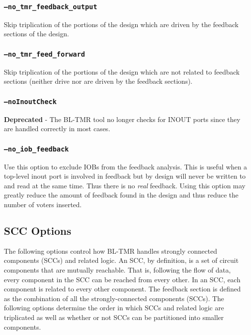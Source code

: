 \documentclass[english]{article}
\begin{document}
\subsubsection{\texttt{--no\_tmr\_feedback\_output}}
Skip triplication of the portions of the design which are driven by the 
feedback sections of the design.

\subsubsection{\texttt{--no\_tmr\_feed\_forward}}
Skip triplication of the portions of the design which are not related to 
feedback sections (neither drive nor are driven by the feedback sections).

\subsubsection{\texttt{--noInoutCheck}}
\textbf{Deprecated} - The BL-TMR tool no longer checks for INOUT ports since they
are handled correctly in most cases.

\subsubsection{\texttt{--no\_iob\_feedback}}
Use this option to exclude IOBs from the feedback analysis. This is useful when
a top-level inout port is involved in feedback but by design will never be 
written to and read at the same time. Thus there is no \emph{real} feedback.
Using this option may greatly reduce the amount of feedback found in the design
and thus reduce the number of voters inserted.

\subsection{SCC Options}
The following options control how BL-TMR handles strongly connected components 
(SCCs) and related logic. An SCC, by definition, is a set of circuit components 
that are mutually reachable. That is, following the flow of data, every 
component in the SCC can be reached from every other. In an SCC, each component 
is related to every other component. The feedback section is defined as the 
combination of all the strongly-connected components (SCCs). The following 
options determine the order in which SCCs and related logic are triplicated as 
well as whether or not SCCs can be partitioned into smaller components.
\end{document}
